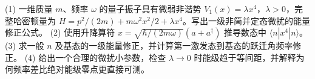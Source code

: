 (1) 一维质量 \(m\)、频率 \(\omega\) 的量子振子具有微弱非谐势 \(V_1(x)=\lambda x^4\)，\(\lambda>0\)，完整哈密顿量为 \(H=p^2/(2m)+m\omega^2x^2/2+\lambda x^4\)。写出一级非简并定态微扰的能量修正公式。
(2) 使用升降算符 \(x=\sqrt{\hbar/(2m\omega)}(a+a^\dagger)\) 推导数态中 \(\langle n|x^4|n\rangle\)。
(3) 求一般 \(n\) 及基态的一级能量修正，并计算第一激发态到基态的跃迁角频率修正。
(4) 给出一个合理的微扰小参数，检查 \(\lambda\to0\) 时能级趋于等间距，并解释为何频率差比绝对能级零点更直接可测。
